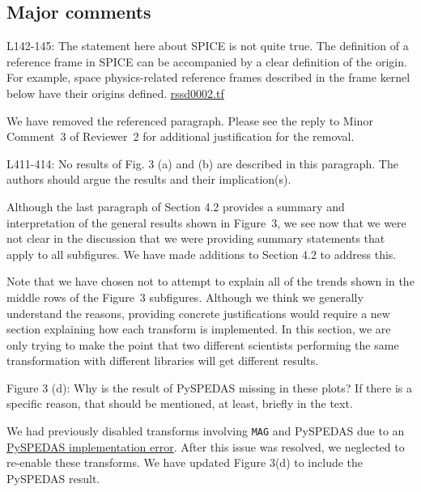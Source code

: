 \documentclass[11pt]{article}
\let\oldhref\href
\renewcommand{\href}[2]{\oldhref{#1}{\uline{#2}}}
\begin{document}
\subsection{Major comments}

L142-145: The statement here about SPICE is not quite true. The definition of a reference frame in SPICE can be accompanied by a clear definition of the origin. For example, space physics-related reference frames described in the frame kernel below have their origins defined.
\href{https://naif.jpl.nasa.gov/pub/naif/pds/pds4/bc/bc_spice/spice_kernels/fk/rssd0002.tf}{rssd0002.tf}
\\
{\color{violet}
\begin{leftbar}
We have removed the referenced paragraph. Please see the reply to Minor Comment~3 of Reviewer~2 for additional justification for the removal.
\end{leftbar}
}

L411-414: No results of Fig. 3 (a) and (b) are described in this paragraph. The authors should argue the results and their implication(s).
\\
{\color{violet}
\begin{leftbar}
Although the last paragraph of Section 4.2 provides a summary and interpretation of the general results shown in Figure~3, we see now that we were not clear in the discussion that we were providing summary statements that apply to all subfigures. We have made additions to Section 4.2 to address this.

Note that we have chosen not to attempt to explain all of the trends shown in the middle rows of the Figure~3 subfigures.  Although we think we generally understand the reasons, providing concrete justifications would require a new section explaining how each transform is implemented. In this section, we are only trying to make the point that two different scientists performing the same transformation with different libraries will get different results.
\end{leftbar}
}

Figure 3 (d): Why is the result of PySPEDAS missing in these plots? If there is a specific reason, that should be mentioned, at least, briefly in the text.
\\
{\color{violet}
\begin{leftbar}
We had previously disabled transforms involving \texttt{MAG} and PySPEDAS due to an \href{https://github.com/spedas/pyspedas/issues/1207}{PySPEDAS implementation error}. After this issue was resolved, we neglected to re-enable these transforms. We have updated Figure 3(d) to include the PySPEDAS result.
\end{leftbar}
}
\end{document}
